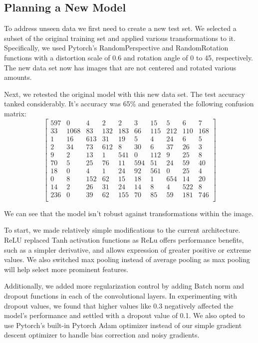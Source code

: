 \documentclass{article}
\begin{document}
\subsection{Planning a New Model}
To address unseen data we first need to create a new test set. We selected a subset of the original training set and applied various transformations to it. Specifically, we used Pytorch's RandomPerspective and RandomRotation functions with a distortion scale of 0.6 and rotation angle of 0 to 45, respectively. The new data set now has images that are not centered and rotated various amounts.

Next, we retested the original model with this new data set. The test accuracy tanked considerably. It's accuracy was 65\% and generated the following confusion matrix: 
$$
\begin{bmatrix}
597&0&4&2&2&3&15&5&6&7\\
33&1068&83&132&183&66&115&212&110&168\\
1&16&613&31&19&5&4&24&6&5\\
2&34&73&612&8&30&6&37&26&3\\
9&2&13&1&541&0&112&9&25&8\\
70&5&25&76&11&594&51&24&59&40\\
18&0&4&1&24&92&561&0&25&4\\
0&8&152&62&15&18&1&654&14&20\\
14&2&26&31&24&14&8&4&522&8\\
236&0&39&62&155&70&85&59&181&746\\
\end{bmatrix}
$$

We can see that the model isn't robust against transformations within the image. 

To start, we made relatively simple modifications to the current architecture. ReLU replaced Tanh activation functions as ReLu offers performance benefits, such as a simpler derivative, and allows expression of greater positive or extreme values. We also switched max pooling instead of average pooling as max pooling will help select more prominent features. 

Additionally, we added more regularization control by adding Batch norm and dropout functions in each of the convolutional layers. In experimenting with dropout values, we found that higher values like 0.3 negatively affected the model's performance and settled with a dropout value of 0.1. We also opted to use Pytorch's built-in Pytorch Adam optimizer instead of our simple gradient descent optimizer to handle bias correction and noisy gradients.
\end{document}
